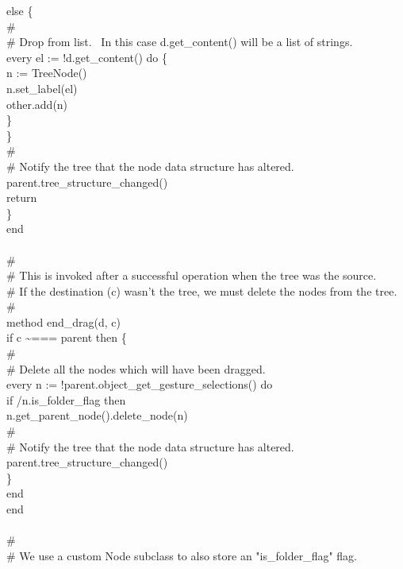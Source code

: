 {\>\>\>else \{ \\
\>\>\>\>\# \\
\>\>\>\>\# Drop from list. \ In this case d.get\_content() will be a list of strings. \\
\>\>\>\>every el := !d.get\_content() do \{ \\
\>\>\>\>\>n := TreeNode() \\
\>\>\>\>\>n.set\_label(el) \\
\>\>\>\>\>other.add(n) \\
\>\>\>\>\>\} \\
\>\>\>\>\} \\
\>\>\>\# \\
\>\>\>\# Notify the tree that the node data structure has altered. \\
\>\>\>parent.tree\_structure\_changed() \\
\>\>\>return \\
\>\>\>\} \\
\>end \\
\ \\
\>\# \\
\>\# This is invoked after a successful operation when the tree was the source.\\
\>\# If the destination (c) wasn't the tree, we must delete the nodes from the tree. \\
\>\# \\
\>method end\_drag(d, c) \\
\>\>if c \~{}=== parent then \{ \\
\>\>\>\# \\
\>\>\>\# Delete all the nodes which will have been dragged. \\
\>\>\>every n := !parent.object\_get\_gesture\_selections() do \\
\>\>\>\>if /n.is\_folder\_flag then \\
\>\>\>\>\>n.get\_parent\_node().delete\_node(n) \\
\>\>\>\# \\
\>\>\>\# Notify the tree that the node data structure has altered. \\
\>\>\>parent.tree\_structure\_changed() \\
\>\>\>\} \\
\>end \\
end \\
\ \\
\# \\
\# We use a custom Node subclass to also store an "is\_folder\_flag" flag. \\
}
